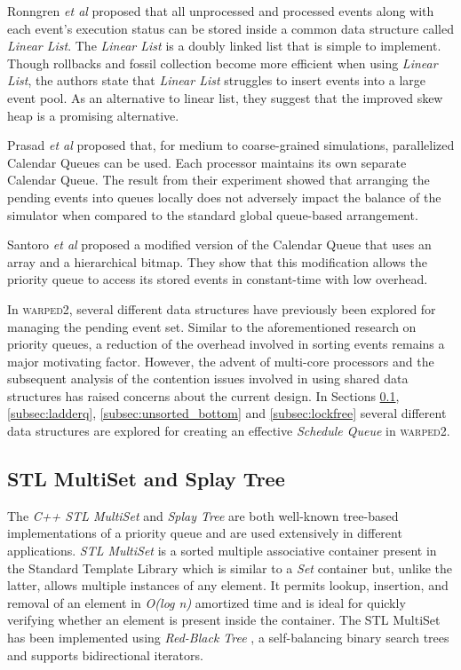 \documentclass[11pt]{book}
\begin{document}
Ronngren \emph{et al} \cite{ronngren-93} proposed that all unprocessed and processed events along with each
event's execution status can be stored inside a common data structure called \emph{Linear List}.  The
\emph{Linear List} is a doubly linked list \cite{newell-57} that is simple to implement.  Though rollbacks and
fossil collection become more efficient when using \emph{Linear List}, the authors \cite{ronngren-93} state
that \emph{Linear List} struggles to insert events into a large event pool.  As an alternative to linear list,
they suggest that the improved skew heap \cite{sleator-86} is a promising alternative.

Prasad \emph{et al} \cite{prasad-95a,prasad-95b} proposed that, for medium to coarse-grained simulations,
parallelized Calendar Queues \cite{brown-88} can be used.  Each processor maintains its own separate Calendar
Queue.  The result from their experiment showed that arranging the pending events into queues locally does not
adversely impact the balance of the simulator when compared to the standard global queue-based arrangement.

Santoro \emph{et al} \cite{santoro-10} proposed a modified version of the Calendar Queue that uses an array
and a hierarchical bitmap.  They show that this modification allows the priority queue to access its stored
events in constant-time with low overhead.

In \textsc{warped2}, several different data structures have previously been explored for managing the pending
event set.  Similar to the aforementioned research on priority queues, a reduction of the overhead involved in
sorting events remains a major motivating factor.  However, the advent of multi-core processors and the
subsequent analysis of the contention issues involved in using shared data structures has raised concerns
about the current design.  In Sections \ref{subsec:stl_multiset_splaytree}, \ref{subsec:ladderq},
\ref{subsec:unsorted_bottom} and \ref{subsec:lockfree} several different data structures are explored for
creating an effective \emph{Schedule Queue} in \textsc{warped2}.

\subsection{STL MultiSet and Splay Tree}\label{subsec:stl_multiset_splaytree}

The \emph{C++ STL MultiSet} and \emph{Splay Tree} are both well-known tree-based implementations of a priority
queue and are used extensively in different applications.  \emph{STL MultiSet} is a sorted multiple
associative container present in the Standard Template Library \cite{musser-89} which is similar to a
\emph{Set} container but, unlike the latter, allows multiple instances of any element.  It permits lookup,
insertion, and removal of an element in \emph{O(log n)} amortized time and is ideal for quickly verifying
whether an element is present inside the container. The STL MultiSet has been implemented using
\emph{Red-Black Tree} \cite{cormen-01}, a self-balancing binary search trees and supports bidirectional
iterators.
\end{document}
